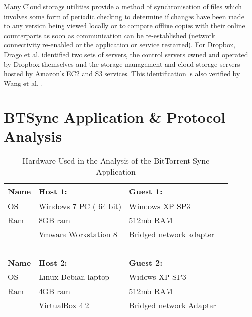 \documentclass[final,5p,times,twocolumn]{elsarticle}
\begin{document}
Many Cloud storage utilities provide a method of synchronisation of files which involves some form of periodic checking to determine if changes have been made to any version being viewed locally or to compare offline copies with their online counterparts as soon as communication can be re-established (network connectivity re-enabled or the application or service restarted). For Dropbox, Drago et al. \cite{Drago:2012:IDU:2398776.2398827} identified two sets of servers, the control servers owned and operated by Dropbox themselves and the storage management and cloud storage servers hosted by Amazon's EC2 and S3 services. This identification is also verified by Wang et al. \cite{wang2012impact}. 

\section{BTSync Application \& Protocol Analysis}
\label{analysis}
\begin{table}[!h]
    \begin{tabular}{l|l|l|l}
      \textbf{Name} & \textbf{Host 1:}                 &  \textbf{Guest 1:}               \\ \hline
    OS     & Windows 7 PC ( 64 bit)  & Windows XP SP3            \\ \hline
    Ram    & 8GB ram                 & 512mb RAM                 \\ \hline
    ~      & Vmware Workstation 8    & Bridged network adapter   \\ \hline
    ~      & ~                       & ~                         \\
      \textbf{Name} & \textbf{Host 2:}                & \textbf{Guest 2:}                  \\ \hline
    OS     & Linux Debian laptop    & Widows XP SP3             \\ \hline
    Ram    & 4GB ram                & 512mb RAM                 \\ \hline
    ~      & VirtualBox 4.2         &   Bridged network Adapter \\
    \end{tabular}
\caption{Hardware Used in the Analysis of the BitTorrent Sync Application}
\label{tab:hardware}
\end{table}
\end{document}
